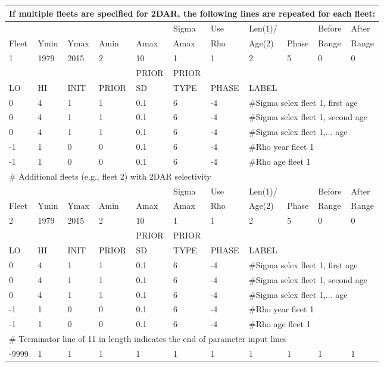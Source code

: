 \begin{longtable}{p{1cm} p{1cm} p{1cm} p{1.25cm} p{1.25cm} p{1.25cm} p{1.2cm} p{1.2cm} p{1cm} p{1cm} p{1cm}}
	\multicolumn{11}{l}{If multiple fleets are specified for 2DAR, the following lines are repeated for each fleet:} \\
	\hline
	\Tstrut &    &      &      &      & Sigma & Use & Len(1)/ &       & Before & After \\
	Fleet & Ymin & Ymax & Amin & Amax & Amax  & Rho & Age(2)  & Phase & Range  & Range \Bstrut\\
	\hline
	   1    & 1979 & 2015 &  2   &  10  & 1     & 1   & 2       & 5     & 0   & 0 \Tstrut\\
	\hline
	     &    &      &     & PRIOR & PRIOR &       &     & & & \Tstrut\\
	LO & HI & INIT & PRIOR & SD    & TYPE  & PHASE & \multicolumn{4}{l}{LABEL} \Bstrut\\
	\hline
	 0 & 4 & 1 & 1 & 0.1 & 6 & -4 & \multicolumn{4}{l}{\#Sigma selex fleet 1, first age} \Tstrut\\
	 0 & 4 & 1 & 1 & 0.1 & 6 & -4 & \multicolumn{4}{l}{\#Sigma selex fleet 1, second age} \Tstrut\\
	 0 & 4 & 1 & 1 & 0.1 & 6 & -4 & \multicolumn{4}{l}{\#Sigma selex fleet 1,... age} \Tstrut\\
	-1 & 1 & 0 & 0 & 0.1 & 6 & -4 & \multicolumn{4}{l}{\#Rho year fleet 1} \\
	-1 & 1 & 0 & 0 & 0.1 & 6 & -4 & \multicolumn{4}{l}{\#Rho age fleet 1} \\
	\hline
	\multicolumn{11}{l}{\# Additional fleets (e.g., fleet 2) with 2DAR selectivity} \\
	\Tstrut &    &      &      &      & Sigma & Use & Len(1)/ &       & Before & After \\
	Fleet & Ymin & Ymax & Amin & Amax & Amax  & Rho & Age(2)  & Phase & Range  & Range \Bstrut\\
	\hline
	2    & 1979 & 2015 &  2   &  10  & 1     & 1   & 2       & 5     & 0   & 0 \Tstrut\\
		\hline
	&    &      &       & PRIOR & PRIOR &       &     & & & \Tstrut\\
	LO & HI & INIT & PRIOR & SD    & TYPE  & PHASE & \multicolumn{4}{l}{LABEL} \Bstrut\\
	\hline
	0 & 4 & 1 & 1 & 0.1 & 6 & -4 & \multicolumn{4}{l}{\#Sigma selex fleet 1, first age} \Tstrut\\
	0 & 4 & 1 & 1 & 0.1 & 6 & -4 & \multicolumn{4}{l}{\#Sigma selex fleet 1, second age} \Tstrut\\
	0 & 4 & 1 & 1 & 0.1 & 6 & -4 & \multicolumn{4}{l}{\#Sigma selex fleet 1,... age} \Tstrut\\
	-1 & 1 & 0 & 0 & 0.1 & 6 & -4 & \multicolumn{4}{l}{\#Rho year fleet 1} \\
	-1 & 1 & 0 & 0 & 0.1 & 6 & -4 & \multicolumn{4}{l}{\#Rho age fleet 1} \\
	\hline
	\multicolumn{11}{l}{\# Terminator line of 11 in length indicates the end of parameter input lines} \\
	-9999 & 1 & 1 & 1 & 1 & 1 & 1 & 1 & 1 & 1 & 1 \\
	\hline
\end{longtable}


